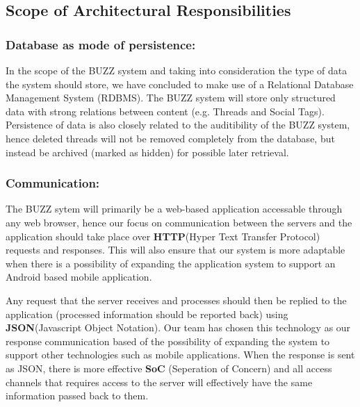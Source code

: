 
\subsection{Scope of Architectural Responsibilities}
	\subsubsection{Database as mode of persistence: }
	In the scope of the BUZZ system and taking into consideration the type of data the system should store, we have concluded to make use of a Relational Database Management System (RDBMS). The BUZZ system will store only structured data with strong relations between content (e.g. Threads and Social Tags). Persistence of data is also closely related to the auditibility of the BUZZ system, hence deleted threads will not be removed completely from the database, but instead be archived (marked as hidden) for possible later retrieval.
	
	\subsubsection{Communication:}
	The BUZZ sytem will primarily be a web-based application accessable through any web browser, hence our focus on communication between the servers and the application should take place over \textbf{HTTP}(Hyper Text Transfer Protocol) requests and responses. This will also ensure that our system is more adaptable when there is a possibility of expanding the application system to support an Android based mobile application. 
	
Any request that the server receives and processes should then be replied to the application (processed information should be reported back) using \textbf{JSON}(Javascript Object Notation). Our team has chosen this technology as our response communication based of the possibility of expanding the system to support other technologies such as mobile applications. When the response is sent as JSON, there is more effective \textbf{SoC} (Seperation of Concern) and all access channels that requires access to the server will effectively have the same information passed back to them.

